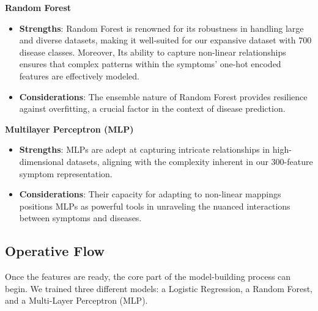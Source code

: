 \noindent
\textbf{Random Forest}\vspace{0.15cm}
\begin{itemize}
    \item \textbf{Strengths}: Random Forest is renowned for its robustness in handling large and diverse datasets, making 
    it well-suited for our expansive dataset with 700 disease classes. Moreover, Its ability to capture non-linear relationships 
    ensures that complex patterns within the symptoms' one-hot encoded features are effectively modeled.
    \item \textbf{Considerations}: The ensemble nature of Random Forest provides resilience against overfitting, a crucial factor 
    in the context of disease prediction.
\end{itemize}
\vspace{0.4cm}

\noindent
\textbf{Multilayer Perceptron (MLP)}\vspace{0.15cm}
\begin{itemize}
    \item \textbf{Strengths}: MLPs are adept at capturing intricate relationships in high-dimensional datasets, 
    aligning with the complexity inherent in our 300-feature symptom representation.
    \item \textbf{Considerations}: Their capacity for adapting to non-linear mappings positions MLPs as powerful 
    tools in unraveling the nuanced interactions between symptoms and diseases.
\end{itemize}




\subsection{Operative Flow}

Once the features are ready, the core part of the model-building process can begin. 
We trained three different models: a Logistic Regression, a Random Forest, and a Multi-Layer Perceptron (MLP).

